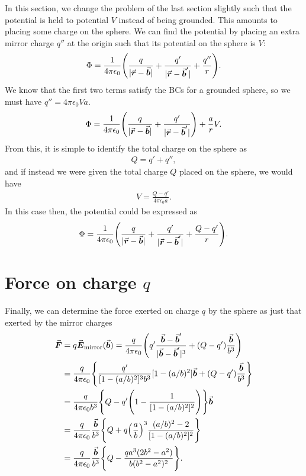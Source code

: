 In this section, we change the problem of the last section slightly such that the potential is held to potential $V$ instead of being grounded.
This amounts to placing some charge on the sphere.
We can find the potential by placing an extra mirror charge $q''$ at the origin such that its potential on the sphere is $V$:
\begin{eqnarray}
    \Phi = \frac{1}{4 \pi \epsilon_0} \Bigg( \frac{q}{|\va*{r} - \va*{b}|} + \frac{q'}{|\va*{r} - \va*{b}'|} + \frac{q''}{r} \Bigg)
.\end{eqnarray}
We know that the first two terms satisfy the BCs for a grounded sphere, so we must have $q'' = 4 \pi \epsilon_0 Va$.
\begin{eqnarray}
    \Phi = \frac{1}{4 \pi \epsilon_0} \Bigg( \frac{q}{|\va*{r} - \va*{b}|} + \frac{q'}{|\va*{r} - \va*{b}'|} \Bigg) + \frac{a}{r} V
.\end{eqnarray}
From this, it is simple to identify the total charge on the sphere as
\begin{eqnarray}
    Q = q' + q''
,\end{eqnarray}
and if instead we were given the total charge $Q$ placed on the sphere, we would have
\begin{eqnarray}
    V = \frac{Q - q'}{4 \pi \epsilon_0 a}
.\end{eqnarray}
In this case then, the potential could be expressed as
\begin{eqnarray}
    \Phi = \frac{1}{4 \pi \epsilon_0} \Bigg( \frac{q}{|\va*{r} - \va*{b}|} + \frac{q'}{|\va*{r} - \va*{b}'|} + \frac{Q - q'}{r} \Bigg)
.\end{eqnarray}


\section{Force on charge $q$}

Finally, we can determine the force exerted on charge $q$ by the sphere as just that exerted by the mirror charges
\begin{align}
    \va*{F} &= q \va*{E}_{\rm mirror}(\va*{b}) = \frac{q}{4 \pi \epsilon_0} \Bigg( q'\frac{\va*{b} - \va*{b}'}{|\va*{b} - \va*{b}'|^3} + (Q - q') \frac{\va*{b}}{b^3} \Bigg) \nonumber \\
    &= \frac{q}{4 \pi \epsilon_0} \Bigg\{ \frac{q'}{[1 - (a/b)^2]^3 b^3}[1 - (a/b)^2]\va*{b} + (Q - q') \frac{\va*{b}}{b^3} \Bigg\} \nonumber \\
    &= \frac{q}{4 \pi \epsilon_0 b^3} \Bigg\{ Q - q' \Bigg( 1 - \frac{1}{[1 - (a/b)^2]^2} \Bigg) \Bigg\} \va*{b} \nonumber \\
    &= \frac{q}{4 \pi \epsilon_0} \frac{\va*{b}}{b^3} \Bigg\{ Q + q \Big( \frac{a}{b} \Big)^3 \frac{(a/b)^2 - 2}{[1 - (a/b)^2]^2} \Bigg\} \nonumber \\
    &= \frac{q}{4 \pi \epsilon_0} \frac{\va*{b}}{b^3} \Bigg\{ Q - \frac{q a^3(2b^2 - a^2)}{b(b^2 - a^2)^2} \Bigg\}
.\end{align}






